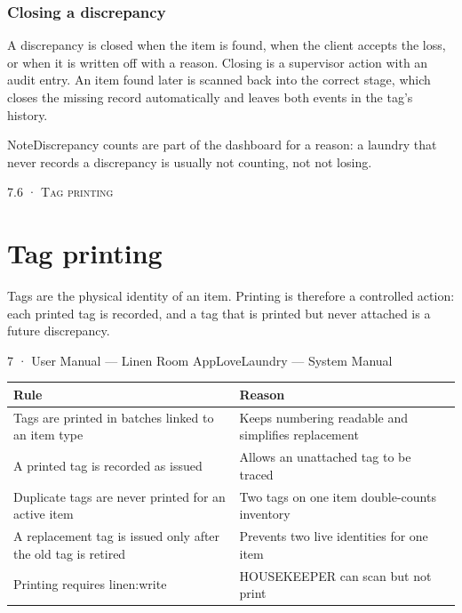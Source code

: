\documentclass[11pt,a4paper,oneside]{book}
\begin{document}
\subsubsection*{Closing a discrepancy}
A discrepancy is closed when the item is found, when the client accepts the loss, or when it is written off with a reason. Closing is a supervisor action with an audit entry. An item found later is scanned back into the correct stage, which closes the missing record automatically and leaves both events in the tag's history.

\begin{notebox}NoteDiscrepancy counts are part of the dashboard for a reason: a laundry that never records a discrepancy is usually not counting, not not losing.\end{notebox}
\textsc{\small\color{crimson}7.6 · Tag printing}\par\medskip
\section*{Tag printing}
Tags are the physical identity of an item. Printing is therefore a controlled action: each printed tag is recorded, and a tag that is printed but never attached is a future discrepancy.

7 · User Manual — Linen Room AppLoveLaundry — System Manual

\begin{center}\small
\begin{tabularx}{\linewidth}{|X|X|}
\hline
\rowcolor{lightgrey}
\textbf{Rule} & \textbf{Reason} \\ \hline
Tags are printed in batches linked to an item type & Keeps numbering readable and simplifies replacement \\ \hline
A printed tag is recorded as issued & Allows an unattached tag to be traced \\ \hline
Duplicate tags are never printed for an active item & Two tags on one item double-counts inventory \\ \hline
A replacement tag is issued only after the old tag is retired & Prevents two live identities for one item \\ \hline
Printing requires linen:write & HOUSEKEEPER can scan but not print \\ \hline
\end{tabularx}
\end{center}
\end{document}
